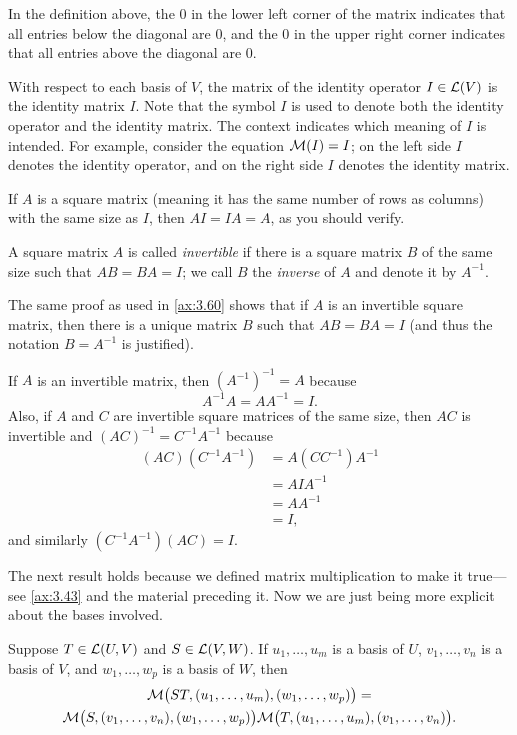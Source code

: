 In the definition above, the $0$ in the lower left corner of the matrix
indicates that all entries below the diagonal are $0$, and the $0$ in the upper
right corner indicates that all entries above the diagonal are $0$.

With respect to each basis of $V$, the matrix of the identity operator
$I\in\mathcal{L}(V)$ is the identity matrix $I$. Note that the symbol $I$ is used to
denote both the identity operator and the identity matrix. The context indicates
which meaning of $I$ is intended. For example, consider the equation
$\mathcal{M}(I)=I$; on the left side $I$ denotes the identity operator, and on the
right side $I$ denotes the identity matrix.

If $A$ is a square matrix (meaning it has the same number of rows as columns)
with the same size as $I$, then $AI=IA=A$, as you should verify.

\begin{definition}\label{ax:3.80}
A square matrix $A$ is called \emph{invertible} if there is a square matrix $B$
of the same size such that $AB=BA=I$; we call $B$ the \emph{inverse} of $A$ and
denote it by $A^{-1}$.
\end{definition}

%
The same proof as used in \ref{ax:3.60} shows that if $A$ is an invertible
square matrix, then there is a unique matrix $B$ such that $AB=BA=I$ (and thus
the notation $B=A^{-1}$ is justified).

If $A$ is an invertible matrix, then $(A^{-1})^{-1}=A$ because
\[ A^{-1}A = AA^{-1} = I. \]
Also, if $A$ and $C$ are invertible square matrices of the same size, then $AC$
is invertible and $(AC)^{-1}=C^{-1}A^{-1}$ because
\begin{align*}
(AC)(C^{-1}A^{-1}) &= A(CC^{-1})A^{-1}\\
                   &= AIA^{-1}\\
                   &= AA^{-1}\\
                   &= I,
\end{align*}
and similarly $(C^{-1}A^{-1})(AC)=I$.

The next result holds because we defined matrix multiplication to make it
true---see \ref{ax:3.43} and the material preceding it. Now we are just being
more explicit about the bases involved.

\begin{result}\label{ax:3.81}
Suppose $T\in\mathcal{L}(U,V)$ and $S\in\mathcal{L}(V,W)$. If $u_1,\dots,u_m$ is a basis of
$U$, $v_1,\dots,v_n$ is a basis of $V$, and $w_1,\dots,w_p$ is a basis of $W$,
then
\begin{multline*}
\mathcal{M}\bigl(ST,(u_1,\dots,u_m),(w_1,\dots,w_p)\bigr) =\\
\mathcal{M}\bigl(S,(v_1,\dots,v_n),(w_1,\dots,w_p)\bigr)
\mathcal{M}\bigl(T,(u_1,\dots,u_m),(v_1,\dots,v_n)\bigr).
\end{multline*}
\end{result}

